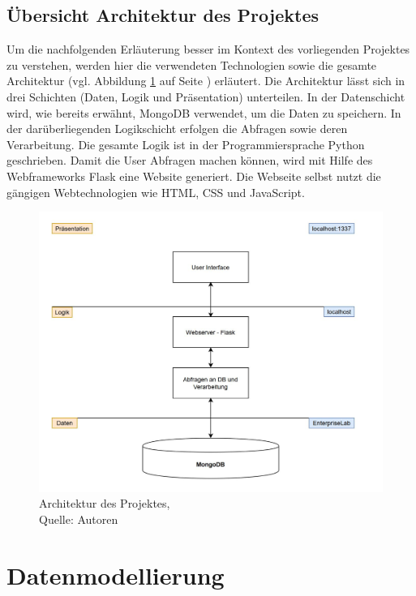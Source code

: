 \documentclass[12pt,titlepage]{article}
\begin{document}
\subsection{Übersicht Architektur des Projektes}
Um die nachfolgenden Erläuterung besser im Kontext des vorliegenden Projektes zu verstehen, werden hier die verwendeten Technologien sowie die gesamte Architektur (vgl. Abbildung \ref{img: Architektur des Projektes} auf Seite \pageref{img: Architektur des Projektes}) erläutert. Die Architektur lässt sich in drei Schichten (Daten, Logik und Präsentation) unterteilen. In der Datenschicht wird, wie bereits erwähnt, MongoDB verwendet, um die Daten zu speichern. In der darüberliegenden Logikschicht erfolgen die Abfragen sowie deren Verarbeitung. Die gesamte Logik ist in der Programmiersprache Python geschrieben. Damit die User Abfragen machen können, wird mit Hilfe des Webframeworks Flask eine Website generiert. Die Webseite selbst nutzt die gängigen Webtechnologien wie HTML, CSS und JavaScript.
\begin{figure}
	\centering
	\includegraphics[width=16cm]{IMG/Architektur.JPG}
	\caption[Architektur des Projektes]{Architektur des Projektes,\\ Quelle: Autoren}
	\label{img: Architektur des Projektes}
\end{figure}
\newpage



\section{Datenmodellierung} \label{Datenmodellierung}
\end{document}
